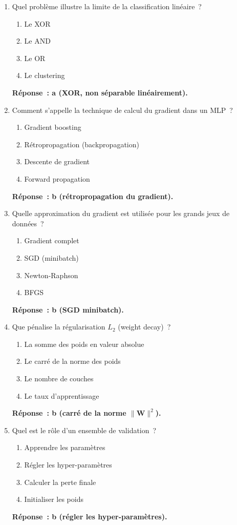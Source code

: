 \documentclass[a4paper,11pt]{article}
\theoremstyle{definition}
\theoremstyle{remark}
\begin{document}
\begin{enumerate}
  \item Quel probl\`eme illustre la limite de la classification
    lin\'eaire~?
    \begin{enumerate}
      \item Le XOR
      \item Le AND
      \item Le OR
      \item Le clustering
    \end{enumerate}
    \textbf{R\'eponse~: a (XOR, non s\'eparable lin\'eairement).}

  \item Comment s'appelle la technique de calcul du gradient dans
    un MLP~?
    \begin{enumerate}
      \item Gradient boosting
      \item R\'etropropagation (backpropagation)
      \item Descente de gradient
      \item Forward propagation
    \end{enumerate}
    \textbf{R\'eponse~: b (r\'etropropagation du gradient).}

  \item Quelle approximation du gradient est utilis\'ee pour les
    grands jeux de donn\'ees~?
    \begin{enumerate}
      \item Gradient complet
      \item SGD (minibatch)
      \item Newton-Raphson
      \item BFGS
    \end{enumerate}
    \textbf{R\'eponse~: b (SGD minibatch).}

  \item Que p\'enalise la r\'egularisation $L_2$ (weight decay)~?
    \begin{enumerate}
      \item La somme des poids en valeur absolue
      \item Le carr\'e de la norme des poids
      \item Le nombre de couches
      \item Le taux d'apprentissage
    \end{enumerate}
    \textbf{R\'eponse~: b (carr\'e de la norme $\|\mathbf{W}\|^2$).}

  \item Quel est le r\^ole d'un ensemble de validation~?
    \begin{enumerate}
      \item Apprendre les param\`etres
      \item R\'egler les hyper-param\`etres
      \item Calculer la perte finale
      \item Initialiser les poids
    \end{enumerate}
    \textbf{R\'eponse~: b (r\'egler les hyper-param\`etres).}


\end{enumerate}
\end{document}
